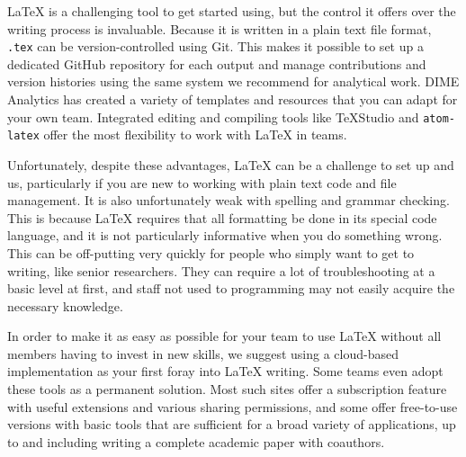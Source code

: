 {\LaTeX} is a challenging tool to get started using,
but the control it offers over the writing process is invaluable.
Because it is written in a plain text file format,
\texttt{.tex} can be version-controlled using Git.
This makes it possible to set up a dedicated GitHub repository for each output
and manage contributions and version histories
using the same system we recommend for analytical work.
DIME Analytics has created a variety of templates and resources
that you can adapt for your own team.
Integrated editing and compiling tools like TeXStudio
and \texttt{atom-latex}
offer the most flexibility to work with {\LaTeX} in teams.

Unfortunately, despite these advantages, {\LaTeX} can be a challenge to set up and us,
particularly if you are new to working with plain text code and file management.
It is also unfortunately weak with spelling and grammar checking.
This is because {\LaTeX} requires that all formatting be done in its special code language,
and it is not particularly informative when you do something wrong.
This can be off-putting very quickly for people
who simply want to get to writing, like senior researchers.
They can require a lot of troubleshooting at a basic level at first,
and staff not used to programming may not easily acquire the necessary knowledge.

In order to make it as easy as possible for your team
to use {\LaTeX} without all members having to invest in new skills,
we suggest using a cloud-based implementation as your first foray into {\LaTeX} writing.
Some teams even adopt these tools as a permanent solution.
Most such sites offer a subscription feature
with useful extensions and various sharing permissions,
and some offer free-to-use versions with basic tools that are sufficient
for a broad variety of applications,
up to and including writing a complete academic paper with coauthors.

